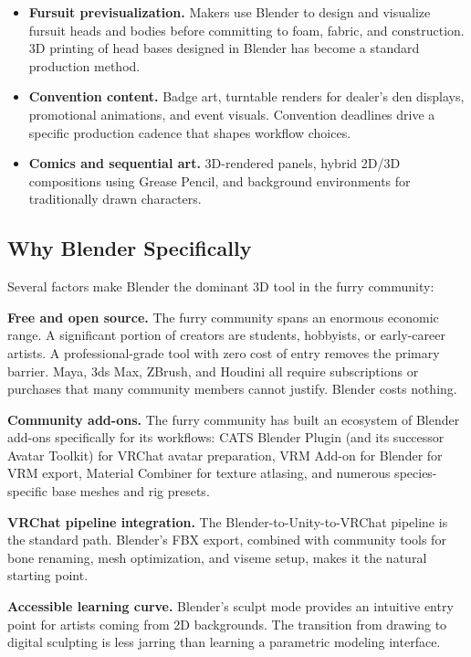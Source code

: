 \begin{itemize}[leftmargin=2em]
  \item \textbf{Fursuit previsualization.} Makers use Blender to design and visualize fursuit heads and bodies before committing to foam, fabric, and construction. 3D printing of head bases designed in Blender has become a standard production method.

  \item \textbf{Convention content.} Badge art, turntable renders for dealer's den displays, promotional animations, and event visuals. Convention deadlines drive a specific production cadence that shapes workflow choices.

  \item \textbf{Comics and sequential art.} 3D-rendered panels, hybrid 2D/3D compositions using Grease Pencil, and background environments for traditionally drawn characters.
\end{itemize}


\subsection{Why Blender Specifically}

Several factors make Blender the dominant 3D tool in the furry community:

\textbf{Free and open source.} The furry community spans an enormous economic range. A significant portion of creators are students, hobbyists, or early-career artists. A professional-grade tool with zero cost of entry removes the primary barrier. Maya, 3ds Max, ZBrush, and Houdini all require subscriptions or purchases that many community members cannot justify. Blender costs nothing.

\textbf{Community add-ons.} The furry community has built an ecosystem of Blender add-ons specifically for its workflows: CATS Blender Plugin (and its successor Avatar Toolkit) for VRChat avatar preparation, VRM Add-on for Blender for VRM export, Material Combiner for texture atlasing, and numerous species-specific base meshes and rig presets.

\textbf{VRChat pipeline integration.} The Blender-to-Unity-to-VRChat pipeline is the standard path. Blender's FBX export, combined with community tools for bone renaming, mesh optimization, and viseme setup, makes it the natural starting point.

\textbf{Accessible learning curve.} Blender's sculpt mode provides an intuitive entry point for artists coming from 2D backgrounds. The transition from drawing to digital sculpting is less jarring than learning a parametric modeling interface.

